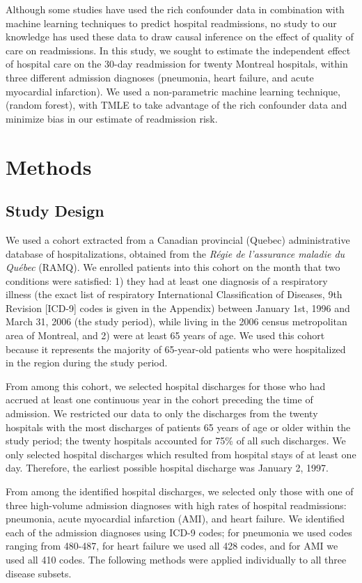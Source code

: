 \documentclass[]{article}\usepackage[]{graphicx}\usepackage[]{color}
\begin{document}
Although some studies have used the rich confounder data in combination with machine learning techniques to predict hospital readmissions, no study to our knowledge has used these data to draw causal inference on the effect of quality of care on readmissions. In this study, we sought to estimate the independent effect of hospital care on the 30-day readmission for twenty Montreal hospitals, within three different admission diagnoses (pneumonia, heart failure, and acute myocardial infarction). We used a non-parametric machine learning technique, (random forest\supercite{breiman_random_2001}), with TMLE to take advantage of the rich confounder data and minimize bias in our estimate of readmission risk.

\section{Methods}

\subsection{Study Design}
We used a cohort extracted from a Canadian provincial (Quebec) administrative database of hospitalizations, obtained from the \emph{Régie de l'assurance maladie du Québec} (RAMQ). We enrolled patients into this cohort on the month that two conditions were satisfied: 1) they had at least one diagnosis of a respiratory illness (the exact list of respiratory International Classification of Diseases, 9th Revision [ICD-9] codes is given in the Appendix) between January 1st, 1996 and March 31, 2006 (the study period), while living in the 2006 census metropolitan area of Montreal, and 2) were at least 65 years of age. We used this cohort because it represents the majority of 65-year-old patients who were hospitalized in the region during the study period.

From among this cohort, we selected hospital discharges for those who had accrued at least one continuous year in the cohort preceding the time of admission. We restricted our data to only the discharges from the twenty hospitals with the most discharges of patients 65 years of age or older within the study period; the twenty hospitals accounted for 75\% of all such discharges.  We only selected hospital discharges which resulted from hospital stays of at least one day. Therefore, the earliest possible hospital discharge was January 2, 1997.

From among the identified hospital discharges, we selected only those with one of three high-volume admission diagnoses with high rates of hospital readmissions: pneumonia, acute myocardial infarction (AMI), and heart failure. We identified each of the admission diagnoses using ICD-9 codes; for pneumonia we used codes ranging from 480-487, for heart failure we used all 428 codes, and for AMI we used all 410 codes. The following methods were applied individually to all three disease subsets.
\end{document}
